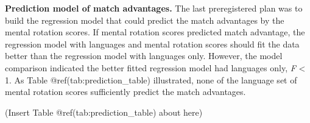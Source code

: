 \documentclass[
  man,floatsintext]{apa6}
\begin{document}
\textbf{Prediction model of match advantages.} The last preregistered plan was to build the regression model that could predict the match advantages by the mental rotation scores. If mental rotation scores predicted match advantage, the regression model with languages and mental rotation scores should fit the data better than the regression model with languages only. However, the model comparison indicated the better fitted regression model had languages only, \emph{F} \textless{} 1. As Table @ref(tab:prediction\_table) illustrated, none of the language set of mental rotation scores sufficiently predict the match advantages.

(Insert Table @ref(tab:prediction\_table) about here)

\providecommand{\docline}[3]{\noalign{\global\setlength{\arrayrulewidth}{#1}}\arrayrulecolor[HTML]{#2}\cline{#3}}

\setlength{\tabcolsep}{2pt}

\renewcommand*{\arraystretch}{1.5}
\end{document}
